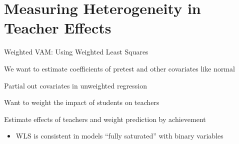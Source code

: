 \documentclass[t,aspectratio=169,11pt]{beamer}
\newenvironment{wideitemize}{\itemize\addtolength{\itemsep}{14pt}}{\enditemize}
\begin{document}
\section{Measuring Heterogeneity in Teacher Effects}


\begin{frame}{Weighted VAM: Using Weighted Least Squares}

\begin{wideitemize}

    \item We want to estimate coefficients of pretest and other covariates like normal 
    \item Partial out covariates in unweighted regression
    \item Want to weight the impact of students on teachers
    \item Estimate effects of teachers and weight prediction by achievement
        \begin{itemize}
        \item  WLS is consistent in models ``fully saturated'' with binary  variables  \citet{solon2015we} 
        \end{itemize}

\end{wideitemize}



\end{frame}


\end{document}
